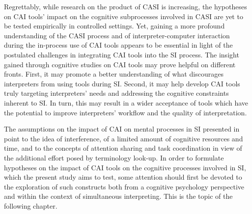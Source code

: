 Regrettably, while research on the product of CASI is increasing, the hypotheses on CAI tools' impact on the cognitive subprocesses involved in CASI are yet to be tested empirically in controlled settings. Yet, gaining a more profound understanding of the CASI process and of interpreter-computer interaction during the in-process use of CAI tools appears to be essential in light of the postulated challenges in integrating CAI tools into the SI process. The insight gained through cognitive studies on CAI tools may prove helpful on different fronts. First, it may promote a better understanding of what discourages interpreters from using tools during SI. Second, it may help develop CAI tools truly targeting interpreters' needs and addressing the cognitive constraints inherent to SI. In turn, this may result in a wider acceptance of tools which have the potential to improve interpreters' workflow and the quality of interpretation.

The assumptions on the impact of CAI on mental processes in SI presented in  point to the idea of interference, of a limited amount of cognitive resources and time, and to the concepts of attention sharing and task coordination in view of the additional effort posed by terminology look-up. In order to formulate hypotheses on the impact of CAI tools on the cognitive processes involved in SI, which the present study aims to test, some attention should first be devoted to the exploration of such constructs both from a cognitive psychology perspective and within the context of simultaneous interpreting. This is the topic of the following chapter.





































